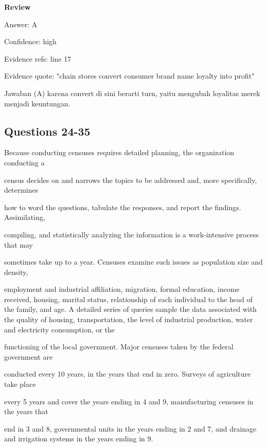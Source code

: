 \documentclass[12pt]{article}
\begin{document}
\par
\begingroup
\setlength{\parskip}{0pt}
\setlength{\parindent}{0pt}
\textbf{Review}\par
Answer: A\par
Confidence: high\par
Evidence refs: line 17\par
Evidence quote: "chain stores convert consumer brand name loyalty into profit"\par
Jawaban (A) karena convert di sini berarti turn, yaitu mengubah loyalitas merek menjadi keuntungan.\par
\endgroup
\par
\vspace{0.25\baselineskip}
\subsection*{Questions 24-35}
\begingroup
\small
\sloppy
\setlength{\parskip}{0pt}
\setlength{\parindent}{0pt}
Because conducting censuses requires detailed planning, the organization conducting a\par
census decides on and narrows the topics to be addressed and, more specifically, determines\par
how to word the questions, tabulate the responses, and report the findings. Assimilating,\par
compiling, and statistically analyzing the information is a work-intensive process that may\par
sometimes take up to a year. Censuses examine such issues as population size and density,\par
employment and industrial affiliation, migration, formal education, income received, housing, marital status, relationship of each individual to the head of the family, and age. A detailed series of queries sample the data associated with the quality of housing, transportation, the level of industrial production, water and electricity consumption, or the\par
functioning of the local government. Major censuses taken by the federal government are\par
conducted every 10 years, in the years that end in zero. Surveys of agriculture take place\par
every 5 years and cover the years ending in 4 and 9, manufacturing censuses in the years that\par
end in 3 and 8, governmental units in the years ending in 2 and 7, and drainage and irrigation systems in the years ending in 9.\par
\end{document}
